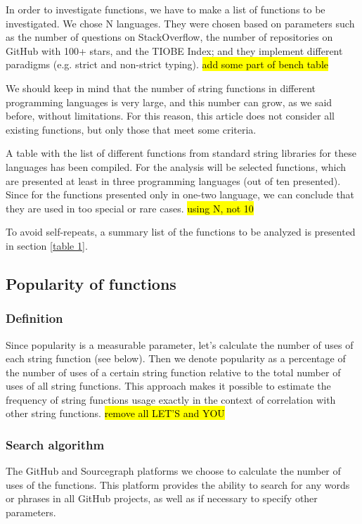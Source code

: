 \documentclass[anonymous,sigplan,review,11pt,nonacm,natbib=false]{acmart}
\begin{document}
    In order to investigate functions, we have to make a list of functions to be investigated. We chose N languages. They were chosen based on parameters such as the number of questions on StackOverflow, the number of repositories on GitHub with 100+ stars, and the TIOBE Index; and they implement different paradigms (e.g. strict and non-strict typing). \hl{add some part of bench table}

    We should keep in mind that the number of string functions in different programming languages is very large, and this number can grow, as we said before, without limitations. For this reason, this article does not consider all existing functions, but only those that meet some criteria.

    A table with the list of different functions from standard string libraries for these languages has been compiled. For the analysis will be selected functions, which are presented at least in three programming languages (out of ten presented). Since for the functions presented only in one-two language, we can conclude that they are used in too special or rare cases. \hl{using N, not 10}

    To avoid self-repeats, a summary list of the functions to be analyzed is presented in section \ref{table 1}.

    \subsection{Popularity of functions}

    \subsubsection{Definition}

    Since popularity is a measurable parameter, let's calculate the number of uses of each string function (see below). Then we denote popularity as a percentage of the number of uses of a certain string function relative to the total number of uses of all string functions. This approach makes it possible to estimate the frequency of string functions usage exactly in the context of correlation with other string functions. \hl{remove all LET'S and YOU}

    \subsubsection{Search algorithm}

    The GitHub and Sourcegraph platforms we choose to calculate the number of uses of the functions. This platform provides the ability to search for any words or phrases in all GitHub projects, as well as if necessary to specify other parameters.
\end{document}

